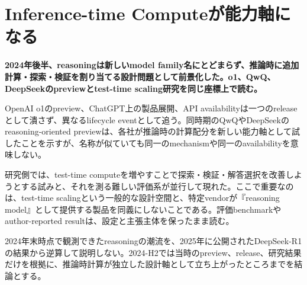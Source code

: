 \section{Inference-time Computeが能力軸になる}
\label{pkg:reasoning}
\noindent\textbf{2024年後半、reasoningは新しいmodel family名にとどまらず、推論時に追加計算・探索・検証を割り当てる設計問題として前景化した。o1、QwQ、DeepSeekのpreviewとtest-time scaling研究を同じ座標上で読む。}\autocite{src-14a855188533,src-a452b2dc7f5d}

OpenAI o1のpreview、ChatGPT上の製品展開、API availabilityは一つのreleaseとして潰さず、異なるlifecycle eventとして追う。同時期のQwQやDeepSeekのreasoning-oriented previewは、各社が推論時の計算配分を新しい能力軸として試したことを示すが、名称が似ていても同一のmechanismや同一のavailabilityを意味しない。\autocite{src-14a855188533,src-a452b2dc7f5d,src-ea823ed75f72}


研究側では、test-time computeを増やすことで探索・検証・解答選択を改善しようとする試みと、それを測る難しい評価系が並行して現れた。ここで重要なのは、test-time scalingという一般的な設計空間と、特定vendorが『reasoning model』として提供する製品を同義にしないことである。評価benchmarkやauthor-reported resultは、設定と主張主体を保ったまま読む。\autocite{src-1f00c386f820,src-259b57a1bad9,src-7c2651c80f45,src-9cf289b414fd}


\begin{claimboundary}
2024年末時点で観測できたreasoningの潮流を、2025年に公開されたDeepSeek-R1の結果から逆算して説明しない。2024-H2では当時のpreview、release、研究結果だけを根拠に、推論時計算が独立した設計軸として立ち上がったところまでを結論とする。\autocite{src-ea823ed75f72}
\end{claimboundary}
